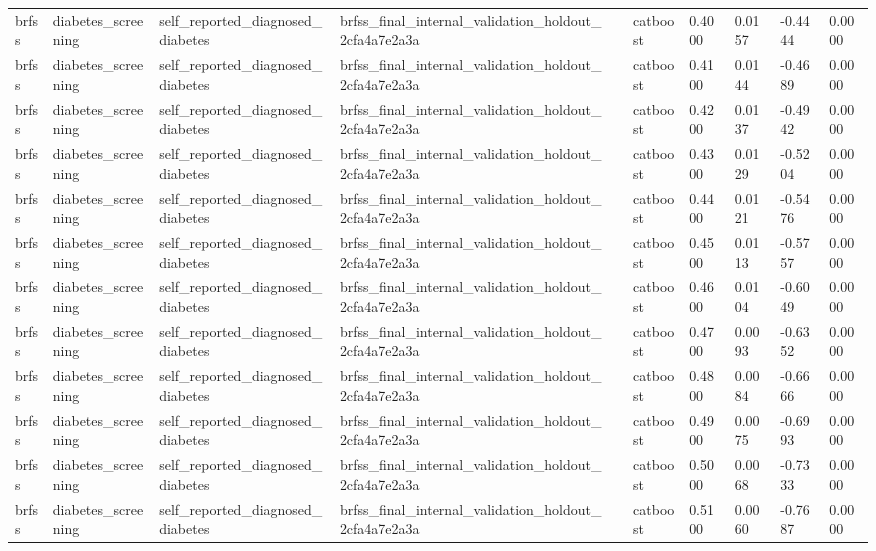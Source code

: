 \begin{tabular}{llllllllll}
brfss & diabetes\_screening & self\_reported\_diagnosed\_diabetes & brfss\_final\_internal\_validation\_holdout\_2cfa4a7e2a3a &  & catboost & 0.4000 & 0.0157 & -0.4444 & 0.0000 \\
brfss & diabetes\_screening & self\_reported\_diagnosed\_diabetes & brfss\_final\_internal\_validation\_holdout\_2cfa4a7e2a3a &  & catboost & 0.4100 & 0.0144 & -0.4689 & 0.0000 \\
brfss & diabetes\_screening & self\_reported\_diagnosed\_diabetes & brfss\_final\_internal\_validation\_holdout\_2cfa4a7e2a3a &  & catboost & 0.4200 & 0.0137 & -0.4942 & 0.0000 \\
brfss & diabetes\_screening & self\_reported\_diagnosed\_diabetes & brfss\_final\_internal\_validation\_holdout\_2cfa4a7e2a3a &  & catboost & 0.4300 & 0.0129 & -0.5204 & 0.0000 \\
brfss & diabetes\_screening & self\_reported\_diagnosed\_diabetes & brfss\_final\_internal\_validation\_holdout\_2cfa4a7e2a3a &  & catboost & 0.4400 & 0.0121 & -0.5476 & 0.0000 \\
brfss & diabetes\_screening & self\_reported\_diagnosed\_diabetes & brfss\_final\_internal\_validation\_holdout\_2cfa4a7e2a3a &  & catboost & 0.4500 & 0.0113 & -0.5757 & 0.0000 \\
brfss & diabetes\_screening & self\_reported\_diagnosed\_diabetes & brfss\_final\_internal\_validation\_holdout\_2cfa4a7e2a3a &  & catboost & 0.4600 & 0.0104 & -0.6049 & 0.0000 \\
brfss & diabetes\_screening & self\_reported\_diagnosed\_diabetes & brfss\_final\_internal\_validation\_holdout\_2cfa4a7e2a3a &  & catboost & 0.4700 & 0.0093 & -0.6352 & 0.0000 \\
brfss & diabetes\_screening & self\_reported\_diagnosed\_diabetes & brfss\_final\_internal\_validation\_holdout\_2cfa4a7e2a3a &  & catboost & 0.4800 & 0.0084 & -0.6666 & 0.0000 \\
brfss & diabetes\_screening & self\_reported\_diagnosed\_diabetes & brfss\_final\_internal\_validation\_holdout\_2cfa4a7e2a3a &  & catboost & 0.4900 & 0.0075 & -0.6993 & 0.0000 \\
brfss & diabetes\_screening & self\_reported\_diagnosed\_diabetes & brfss\_final\_internal\_validation\_holdout\_2cfa4a7e2a3a &  & catboost & 0.5000 & 0.0068 & -0.7333 & 0.0000 \\
brfss & diabetes\_screening & self\_reported\_diagnosed\_diabetes & brfss\_final\_internal\_validation\_holdout\_2cfa4a7e2a3a &  & catboost & 0.5100 & 0.0060 & -0.7687 & 0.0000 \\

\end{tabular}
